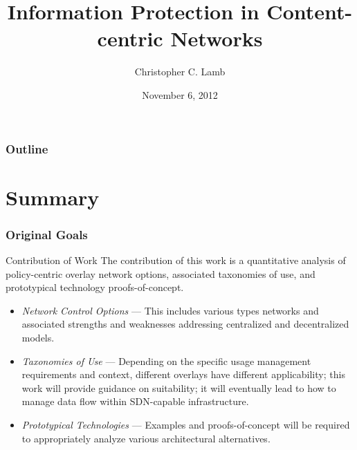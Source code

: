 \documentclass[t,handout]{beamer}
\title{Information Protection in Content-centric Networks}
\author [Chris]{Christopher C. Lamb}
\institute[University of New Mexico]{
\inst {}Department of Electrical and Computer Engineering\\
University of New Mexico}
\date{November 6, 2012}
\begin{document}
\begin{frame}
\titlepage
\end{frame}


\begin{frame}[t]
\frametitle{Outline}
\tableofcontents 
\end{frame}

%

\section{Summary}

\begin{frame}
\frametitle{Original Goals}
\begin{beamerboxesrounded}[shadow]{Contribution of Work}
The contribution of this work is a quantitative analysis of policy-centric overlay network options, associated taxonomies of use, and prototypical technology proofs-of-concept.
\end{beamerboxesrounded}
\begin{itemize}
\item \textit{Network Control Options} --- {\small This includes various types networks and associated strengths and weaknesses addressing centralized and decentralized models.}
\item \textit{Taxonomies of Use} --- {\small Depending on the specific usage management requirements and context, different overlays have different applicability; this work will provide guidance on suitability; it will eventually lead to how to manage data flow within SDN-capable infrastructure.}
\item \textit{Prototypical Technologies} --- {\small Examples and proofs-of-concept will be required to appropriately analyze various architectural alternatives.}
\end{itemize}
\end{frame}
\end{document}
